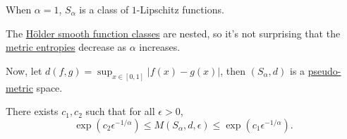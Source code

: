 \begin{note}
	When \(\alpha = 1\), \(S_\alpha \) is a class of \(1\)-Lipschitz functions.
\end{note}

\begin{remark}
	The \hyperref[def:Holder-smooth-function-class]{Hölder smooth function classes} are nested, so it's not surprising that the \hyperref[def:metric-entropy]{metric entropies} decrease as \(\alpha \) increases.
\end{remark}

Now, let \(d(f, g) = \sup _{x\in [0, 1]} \vert f(x) - g(x) \vert \), then \((S_\alpha , d)\) is a \hyperref[def:pseudo-metric]{pseudo-metric} space.

\begin{theorem}\label{thm:metric-entropy}
	There exists \(c_1, c_2\) such that for all \(\epsilon > 0\),
	\[
		\exp \left( c_2 \epsilon ^{-1 / \alpha } \right)
		\leq M(S_\alpha , d, \epsilon )
		\leq \exp \left( c_1 \epsilon ^{-1 / \alpha } \right) .
	\]
\end{theorem}
